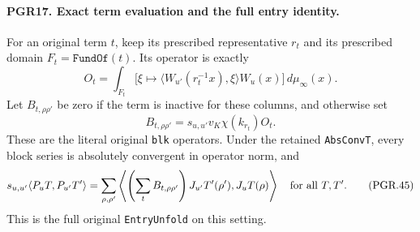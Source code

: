 \paragraph{PGR17. Exact term evaluation and the full entry identity.}
\label{claim:PGR17}
For an original term \(t\), keep its prescribed representative
\(r_t\) and its prescribed domain \(F_t=\texttt{FundOf}(t)\).
Its operator is exactly
\[
 O_t=\int_{F_t}
      \bigl[\xi\longmapsto
       \langle W_{u'}(r_t^{-1}x),\xi\rangle W_u(x)\bigr]
                                         \,d\mu_\infty(x).
\tag{PGR.43}
\]
Let \(B_{t,\rho\rho'}\) be zero if the term is inactive for
these columns, and otherwise set
\[
 B_{t,\rho\rho'}=s_{u,u'}v_K\chi(k_{r_t})O_t.
\tag{PGR.44}
\]
These are the literal original \texttt{blk} operators.  Under
the retained \texttt{AbsConvT}, every block series is absolutely
convergent in operator norm, and
\[
 s_{u,u'}\langle P_uT,P_{u'}T'\rangle
   =\sum_{\rho,\rho'}
      \left\langle
       \left(\sum_t B_{t,\rho\rho'}\right)J_{u'}T'(\rho'),
                         J_uT(\rho)\right\rangle
                   \quad\hbox{for all }T,T'.
\tag{PGR.45}
\]
This is the full original \texttt{EntryUnfold} on this setting.
